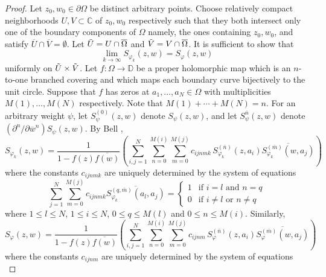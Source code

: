 \documentclass[11pt, reqno]{amsart}
\numberwithin{equation}{section}
\begin{document}
	\begin{proof}
		Let $z_0,w_0\in\partial\Omega$ be distinct arbitrary points. Choose relatively compact neighborhoods $U, V\subset\mathbb{C}$ of $z_0, w_0$ respectively such that they both intersect only one of the boundary components of $\Omega$ namely, the ones containing $z_0, w_0$, and satisfy $\overline{U}\cap \overline{V} = \emptyset$. Let $\Tilde{U} = U\cap\overline{\Omega}$ and $\Tilde{V} = V\cap\overline{\Omega}$. It is sufficient to show that 
		\[
		\lim_{k\rightarrow\infty}S_{\varphi_k}(z,w) = S_{\varphi}(z,w) 
		\]
		uniformly on $\Tilde{U}\times\Tilde{V}$. Let $f:\Omega\rightarrow \mathbb{D}$ be a proper holomorphic map which is an $n$-to-one branched covering and which maps each boundary curve bijectively to the unit circle. Suppose that $f$ has zeros at $a_1,\ldots,a_N \in \Omega$ with multiplicities $M(1),\ldots, M(N)$ respectively. Note that $M(1)+\cdots+M(N) = n$. For an arbitrary weight $\psi$, let $S_{\psi}^{(0)}(z, w)$ denote $S_{\psi}(z, w)$, and let $S_{\psi}^{\overline n}(z, w)$ denote $(\partial^n/\partial {\overline w}^n)S_{\psi}(z, w)$.
        By Bell \cite{Be1}, 
		\begin{equation}\label{rel_k}
			S_{\varphi_k}(z,w) = \frac{1}{1-f(z)\overline{f(w)}} \left(\sum_{i,j=1}^N \sum_{n=0}^{M(i)} \sum_{m=0}^{M(j)} c_{ijnmk}\, S_{\varphi_k}^{(\bar{n})}(z,a_i) \overline{S_{\varphi_k}^{(\bar{m})}(w,a_j)}\right) 
		\end{equation}
		where the constants $c_{ijnmk}$ are uniquely determined by the system of equations
		\begin{equation}\label{constants_k}
			\sum_{j=1}^N\sum_{m=0}^{M(j)}c_{ijnmk}\overline{S_{\varphi_k}^{(q,\bar{m})}(a_l,a_j)}
			=
			\left\{
			\begin{array}{lr}
				1 & \text{if } i=l \text{ and } n=q \\
				0 & \text{if } i\neq l \text{ or } n\neq q
			\end{array}
			\right.
		\end{equation}
		where $1\leq l\leq N$, $1\leq i\leq N$, $0\leq q\leq M(l)$ and $0\leq n\leq M(i)$.  Similarly, 
		\begin{equation}\label{rel}
			S_{\varphi}(z,w) = \frac{1}{1-f(z)\overline{f(w)}} \left(\sum_{i,j=1}^N \sum_{n=0}^{M(i)} \sum_{m=0}^{M(j)} c_{ijnm}\, S_{\varphi}^{(\bar{n})}(z,a_i) \overline{S_{\varphi}^{(\bar{m})}(w,a_j)}\right)
		\end{equation}
		where the constants $c_{ijnm}$ are uniquely determined by the system of equations
		\begin{equation}\label{constants}

\end{equation}
\end{proof}
\end{document}
